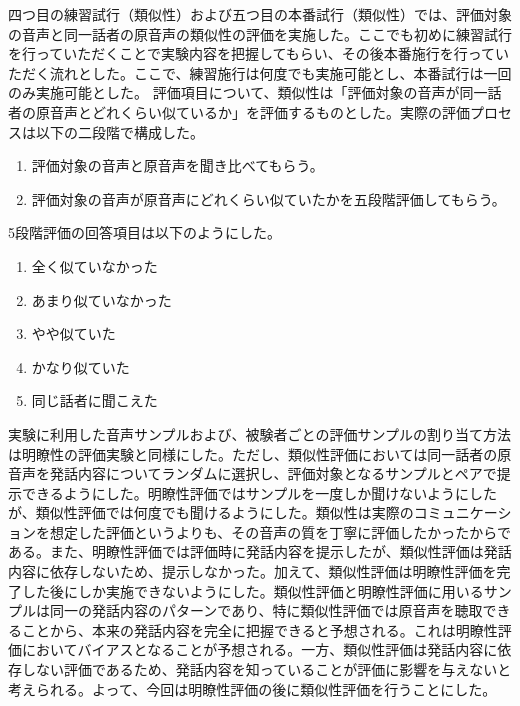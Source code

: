 \documentclass[12pt]{jarticle}
\numberwithin{equation}{section}    %
\numberwithin{figure}{section}      %
\numberwithin{table}{section}      %
\begin{document}
四つ目の練習試行（類似性）および五つ目の本番試行（類似性）では、評価対象の音声と同一話者の原音声の類似性の評価を実施した。ここでも初めに練習試行を行っていただくことで実験内容を把握してもらい、その後本番施行を行っていただく流れとした。ここで、練習施行は何度でも実施可能とし、本番試行は一回のみ実施可能とした。
評価項目について、類似性は「評価対象の音声が同一話者の原音声とどれくらい似ているか」を評価するものとした。実際の評価プロセスは以下の二段階で構成した。
\begin{enumerate}
    \item 評価対象の音声と原音声を聞き比べてもらう。
    \item 評価対象の音声が原音声にどれくらい似ていたかを五段階評価してもらう。
\end{enumerate}
5段階評価の回答項目は以下のようにした。
\begin{enumerate}
    \item 全く似ていなかった
    \item あまり似ていなかった
    \item やや似ていた
    \item かなり似ていた
    \item 同じ話者に聞こえた
\end{enumerate}
実験に利用した音声サンプルおよび、被験者ごとの評価サンプルの割り当て方法は明瞭性の評価実験と同様にした。ただし、類似性評価においては同一話者の原音声を発話内容についてランダムに選択し、評価対象となるサンプルとペアで提示できるようにした。明瞭性評価ではサンプルを一度しか聞けないようにしたが、類似性評価では何度でも聞けるようにした。類似性は実際のコミュニケーションを想定した評価というよりも、その音声の質を丁寧に評価したかったからである。また、明瞭性評価では評価時に発話内容を提示したが、類似性評価は発話内容に依存しないため、提示しなかった。加えて、類似性評価は明瞭性評価を完了した後にしか実施できないようにした。類似性評価と明瞭性評価に用いるサンプルは同一の発話内容のパターンであり、特に類似性評価では原音声を聴取できることから、本来の発話内容を完全に把握できると予想される。これは明瞭性評価においてバイアスとなることが予想される。一方、類似性評価は発話内容に依存しない評価であるため、発話内容を知っていることが評価に影響を与えないと考えられる。よって、今回は明瞭性評価の後に類似性評価を行うことにした。
\end{document}
